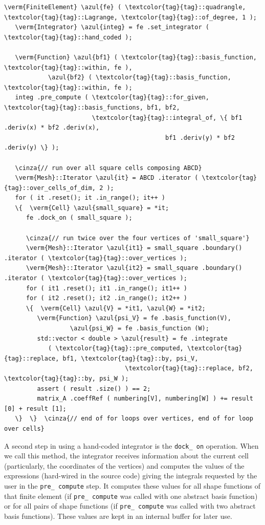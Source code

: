 \begin{Verbatim}[commandchars=\\\{\},formatcom=\small\tt,
   baselinestretch=0.94,framesep=2mm                      ]
   \verm{FiniteElement} \azul{fe} ( \textcolor{tag}{tag}::quadrangle, \textcolor{tag}{tag}::Lagrange, \textcolor{tag}{tag}::of_degree, 1 );
   \verm{Integrator} \azul{integ} = fe .set_integrator ( \textcolor{tag}{tag}::hand_coded );

   \verm{Function} \azul{bf1} ( \textcolor{tag}{tag}::basis_function, \textcolor{tag}{tag}::within, fe ),
            \azul{bf2} ( \textcolor{tag}{tag}::basis_function, \textcolor{tag}{tag}::within, fe );
   integ .pre_compute ( \textcolor{tag}{tag}::for_given, \textcolor{tag}{tag}::basis_functions, bf1, bf2,
                        \textcolor{tag}{tag}::integral_of, \{ bf1 .deriv(x) * bf2 .deriv(x),
                                            bf1 .deriv(y) * bf2 .deriv(y) \} );

   \cinza{// run over all square cells composing ABCD}
   \verm{Mesh}::Iterator \azul{it} = ABCD .iterator ( \textcolor{tag}{tag}::over_cells_of_dim, 2 );
   for ( it .reset(); it .in_range(); it++ )
   \{  \verm{Cell} \azul{small_square} = *it;
      fe .dock_on ( small_square );

      \cinza{// run twice over the four vertices of 'small_square'}
      \verm{Mesh}::Iterator \azul{it1} = small_square .boundary() .iterator ( \textcolor{tag}{tag}::over_vertices );
      \verm{Mesh}::Iterator \azul{it2} = small_square .boundary() .iterator ( \textcolor{tag}{tag}::over_vertices );
      for ( it1 .reset(); it1 .in_range(); it1++ )
      for ( it2 .reset(); it2 .in_range(); it2++ )
      \{  \verm{Cell} \azul{V} = *it1, \azul{W} = *it2;
         \verm{Function} \azul{psi_V} = fe .basis_function(V),
                  \azul{psi_W} = fe .basis_function (W);
         std::vector < double > \azul{result} = fe .integrate 
            ( \textcolor{tag}{tag}::pre_computed, \textcolor{tag}{tag}::replace, bf1, \textcolor{tag}{tag}::by, psi_V,
                                 \textcolor{tag}{tag}::replace, bf2, \textcolor{tag}{tag}::by, psi_W );
         assert ( result .size() ) == 2;
         matrix_A .coeffRef ( numbering[V], numbering[W] ) += result [0] + result [1];
   \}  \}  \cinza{// end of for loops over vertices, end of for loop over cells}
\end{Verbatim}

A second step in using a hand-coded integrator is the {\small\tt dock\_\,on} operation.
When we call this method, the integrator receives information about the current cell
(particularly, the coordinates of the vertices)
and computes the values of the expressions (hard-wired in the source code) giving the integrals
requested by the user in the {\small\tt pre\_\,compute} step.
It computes these values for all shape functions of that finite element
(if {\small\tt pre\_\,compute} was called with one abstract basis function)
or for all pairs of shape functions (if {\small\tt pre\_\,compute} was called with two
abstract basis functions).
These values are kept in an internal buffer for later use.

